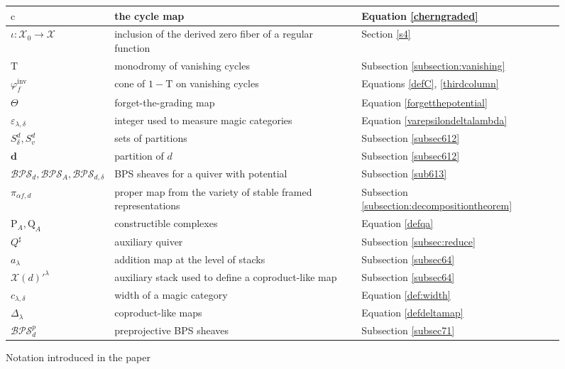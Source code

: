 \documentclass [11pt,oneside,a4paper,mathscr]{amsart}
\theoremstyle{definition}
\newcommand{\X}{\mathscr{X}}
\begin{document}
\begin{figure}
{\begin{tabular}{|l|l|l|}
 $\mathrm{c}$ &  the cycle map &  Equation \eqref{cherngraded}
\\ \hline
$\iota\colon\X_0\to\X$ & inclusion of the derived zero fiber of a regular function & Section \ref{s4}
\\ \hline
$\mathrm{T}$ & monodromy of vanishing cycles &
Subsection \ref{subsection:vanishing}
\\ \hline
$\varphi_f^{\mathrm{inv}}$ & cone of $1-\mathrm{T}$ on vanishing cycles &
Equations \eqref{defC}, \eqref{thirdcolumn}
\\ \hline
$\Theta$ & forget-the-grading map &
Equation \eqref{forgetthepotential}
\\ \hline
$\varepsilon_{\lambda, \delta}$  & integer used to measure magic categories &
Equation \eqref{varepsilondeltalambda}
\\ \hline
$S^d_\delta, S^d_v$ & sets of partitions &
Subsection \ref{subsec612}
\\ \hline
$\mathbf{d}$ & partition of $d$ &
Subsection \ref{subsec612}
\\ \hline
$\mathcal{BPS}_d, \mathcal{BPS}_A, \mathcal{BPS}_{d,\delta}$ & BPS sheaves for a quiver with potential &
Subsection \ref{sub613}
\\ \hline
$\pi_{\alpha f,d}$ & proper map from the variety of stable framed representations
& Subsection \ref{subsection:decompositiontheorem}
\\ \hline
$\mathrm{P}_A, \mathrm{Q}_A$ & constructible complexes & Equation \eqref{defqa}
\\ \hline
$Q^\sharp$ & auxiliary quiver & Subsection \ref{subsec:reduce}
\\ \hline
$a_\lambda$ & addition map at the level of stacks &
Subsection \ref{subsec64}
\\ \hline
$\X(d)'^\lambda$ & auxiliary stack used to define a coproduct-like map &
Subsection \ref{subsec64}
\\ \hline
$c_{\lambda,\delta}$ & width of a magic category &
Equation \eqref{def:width}
\\ \hline
$\Delta_\lambda$ & coproduct-like maps & Equation \eqref{defdeltamap}
\\ \hline
$\mathcal{BPS}^p_d$ & preprojective BPS sheaves &
Subsection \ref{subsec71}
\\ \hline
	\end{tabular}
}
	\vspace{.5cm}
	 \caption{Notation introduced in the paper}
	 \label{table:notation}
\end{figure}
\end{document}
